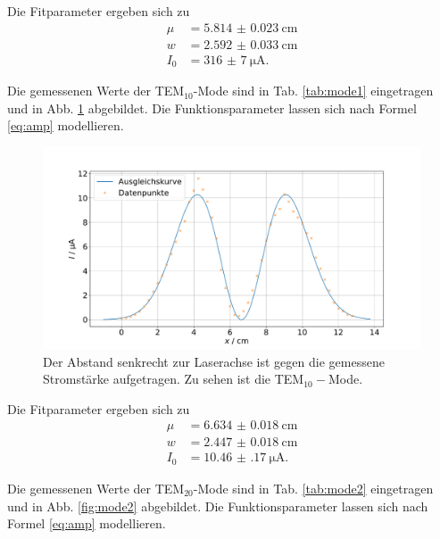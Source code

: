 Die Fitparameter ergeben sich zu 
\begin{align*}
    \mu &= \SI{5.814(23)}{\centi\meter} \\
    w &= \SI{2.592(33)}{\centi\meter} \\ 
    I_0 &= \SI{316(7)}{\micro\ampere}.
\end{align*}


Die gemessenen Werte der TEM$_{10}$-Mode sind in Tab. \ref{tab:mode1} eingetragen und in Abb. \ref{fig:mode1} abgebildet. 
Die Funktionsparameter lassen sich nach Formel \eqref{eq:amp} modellieren.



\begin{figure}
    \centering
    \includegraphics[width=15cm]{plots/mode1.pdf}
    \caption{Der Abstand senkrecht zur Laserachse ist gegen die gemessene Stromstärke aufgetragen. Zu sehen ist die TEM$_{10}-$Mode.}
    \label{fig:mode1}
\end{figure}

Die Fitparameter ergeben sich zu 
\begin{align*}
    \mu &= \SI{6.634(18)}{\centi\meter} \\
    w &= \SI{2.447(18)}{\centi\meter} \\ 
    I_0 &= \SI{10.46(17)}{\micro\ampere}.
\end{align*}

Die gemessenen Werte der TEM$_{20}$-Mode sind in Tab. \ref{tab:mode2} eingetragen und in Abb. \ref{fig:mode2} abgebildet. 
Die Funktionsparameter lassen sich nach Formel \eqref{eq:amp} modellieren.



